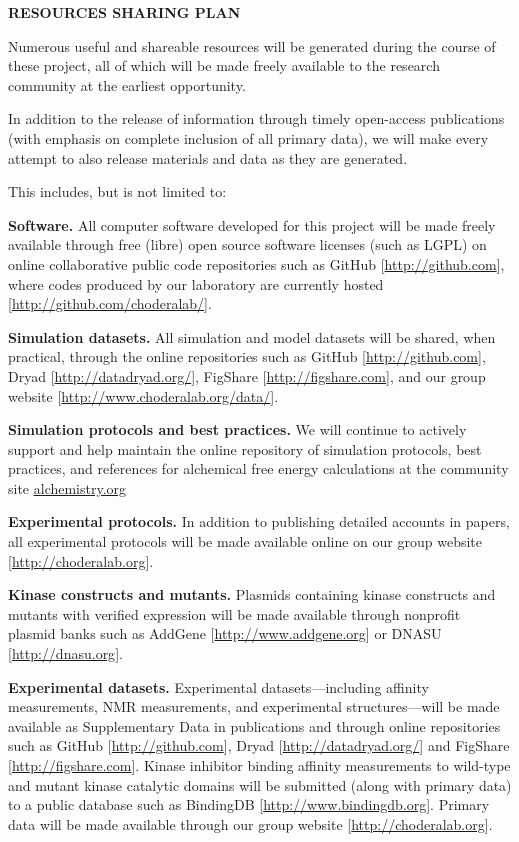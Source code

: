 \documentclass[11pt]{article}
\begin{document}

{\bf RESOURCES SHARING PLAN}

Numerous useful and shareable resources will be generated during the course of these project, all of which will be made freely available to the research community at the earliest opportunity.

In addition to the release of information through timely open-access publications (with emphasis on complete inclusion of all primary data), we will make every attempt to also release materials and data as they are generated.

This includes, but is not limited to:

{\bf Software.} All computer software developed for this project will be made freely available through free (libre) open source software licenses (such as LGPL) on online collaborative public code repositories such as GitHub [\url{http://github.com}], where codes produced by our laboratory are currently hosted [\url{http://github.com/choderalab/}].

{\bf Simulation datasets.} All simulation and model datasets will be shared, when practical, through the online repositories such as GitHub [\url{http://github.com}], Dryad [\url{http://datadryad.org/}], FigShare [\url{http://figshare.com}], and our group website [\url{http://www.choderalab.org/data/}]. 

{\bf Simulation protocols and best practices.} We will continue to actively support and help maintain the online repository of simulation protocols, best practices, and references for alchemical free energy calculations at the community site \url{alchemistry.org}

{\bf Experimental protocols.} In addition to publishing detailed accounts in papers, all experimental protocols will be made available online on our group website [\url{http://choderalab.org}].

{\bf Kinase constructs and mutants.} Plasmids containing kinase constructs and mutants with verified expression will be made available through nonprofit plasmid banks such as AddGene [\url{http://www.addgene.org}] or DNASU [\url{http://dnasu.org}].

{\bf Experimental datasets.} Experimental datasets---including affinity measurements, NMR measurements, and experimental structures---will be made available as Supplementary Data in publications and through online repositories such as GitHub [\url{http://github.com}], Dryad [\url{http://datadryad.org/}] and FigShare [\url{http://figshare.com}]. 
Kinase inhibitor binding affinity measurements to wild-type and mutant kinase catalytic domains will be submitted (along with primary data) to a public database such as BindingDB [\url{http://www.bindingdb.org}].
Primary data will be made available through our group website [\url{http://choderalab.org}].
\end{document}
